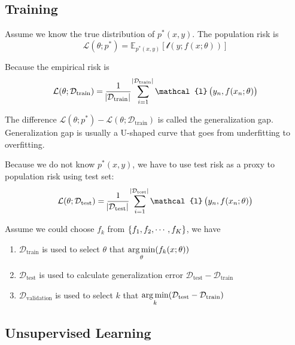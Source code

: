 \subsection{Training}

\begin{definition}
    Assume we know the true distribution of $p^*(x,y)$. The population risk is
    \begin{equation}
        \mathcal{L}(\theta;p^*) = \mathbb{E}_{p^*(x,y)}\left[\mathcal{l}\left(y; f(x;\theta) \right)\right]
    \end{equation}
    
    Because the empirical risk is 
    \begin{equation}
        \mathcal{L}(\theta;\mathcal{D}_{\text{train}}) = \frac{1}{\absolutevalue{\mathcal{D}_{\text{train}}}} \sum_{i=1}^{\absolutevalue{\mathcal{D}_{\text{train}}}} \mathcal{l}\left( y_n, f(x_n; \theta) \right)
    \end{equation}
    
    The difference $\mathcal{L}(\theta;p^*) - \mathcal{L}(\theta;\mathcal{D}_{\text{train}})$ is called the generalization gap. Generalization gap is usually a U-shaped curve that goes from underfitting to overfitting.
    
    Because we do not know $p^*(x,y)$, we have to use test risk as a proxy to population risk using test set:
    \begin{equation}
        \mathcal{L}(\theta;\mathcal{D}_{\text{test}}) = \frac{1}{\absolutevalue{\mathcal{D}_{\text{test}}}} \sum_{i=1}^{\absolutevalue{\mathcal{D}_{\text{test}}}} \mathcal{l}\left( y_n, f(x_n; \theta) \right)
    \end{equation}
\end{definition}

Assume we could choose $f_k$ from $\set{f_1, f_2, \cdots, f_K}$, we have
\begin{enumerate}
    \item $\mathcal{D}_{\text{train}}$ is used to select $\theta$ that $\mathop{\arg\min}\limits_{\theta}(f_k(x;\theta))$
    \item $\mathcal{D}_{\text{test}}$ is used to calculate generalization error $\mathcal{D}_{\text{test}} - \mathcal{D}_{\text{train}}$
    \item $\mathcal{D}_{\text{validation}}$ is used to select $k$ that $\mathop{\arg\min}\limits_{k}(\mathcal{D}_{\text{test}} - \mathcal{D}_{\text{train}})$
\end{enumerate}


\subsection{Unsupervised Learning}

